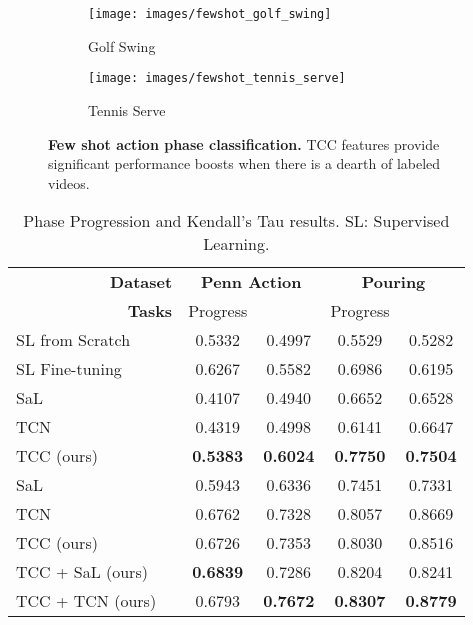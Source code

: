 \documentclass[10pt,twocolumn,letterpaper]{article}
\begin{document}
\begin{figure}
    \centering

        \begin{subfigure}[b]{0.23\textwidth}
        \texttt{[image: images/fewshot\_golf\_swing]}
        \caption{Golf Swing}
    \end{subfigure}
        \begin{subfigure}[b]{0.23\textwidth}
        \texttt{[image: images/fewshot\_tennis\_serve]}
        \caption{Tennis Serve}
    \end{subfigure}
    \caption{\textbf{Few shot action phase classification.} TCC features provide significant performance boosts when there is a dearth of labeled videos.}\label{fig:fewshot}
\end{figure}

\begin{table}[!h]

\centering
\footnotesize{

\begin{tabular}{ll|cc|cc}
\toprule
\multicolumn{2}{r|}{\textbf{Dataset }} & \multicolumn{2}{c|}{\textbf{Penn Action}} & \multicolumn{2}{c}{\textbf{Pouring}} \\
\multicolumn{2}{r|}{\textbf{Tasks }} & Progress &  & Progress &  \\
\midrule
\multicolumn{2}{l|}{{SL from Scratch}} &  0.5332 & 0.4997 & 0.5529	& 0.5282\\
\multicolumn{2}{l|}{{SL Fine-tuning}} &  0.6267 & 0.5582 & 0.6986 & 0.6195\\
\midrule
SaL~\cite{misra2016shuffle} & \parbox[t]{1.5mm}{} &  0.4107 & 0.4940 & 0.6652 & 0.6528\\
TCN~\cite{Sermanet2017TCN} & &  0.4319 & 0.4998	& 0.6141 & 0.6647\\
TCC (ours) & & \textbf{0.5383} & \textbf{0.6024} & \textbf{0.7750} & \textbf{0.7504}\\
\midrule
SaL~\cite{misra2016shuffle} & \parbox[t]{1.5mm}{} &  0.5943 & 0.6336 & 0.7451 & 0.7331\\
TCN~\cite{Sermanet2017TCN} & &  0.6762	& 0.7328 & 0.8057 & 0.8669\\
TCC (ours) & &  0.6726 & 0.7353 & 0.8030 & 0.8516\\
TCC + SaL (ours)& & \textbf{0.6839} & 0.7286 & 0.8204 & 0.8241\\
TCC + TCN (ours) & &  0.6793 & \textbf{0.7672} & \textbf{0.8307} & \textbf{0.8779}\\
\bottomrule
\end{tabular}
}
\caption{Phase Progression and Kendall's Tau results. SL: Supervised Learning.}
\label{tab:all_regression_results}
\end{table}
\end{document}
